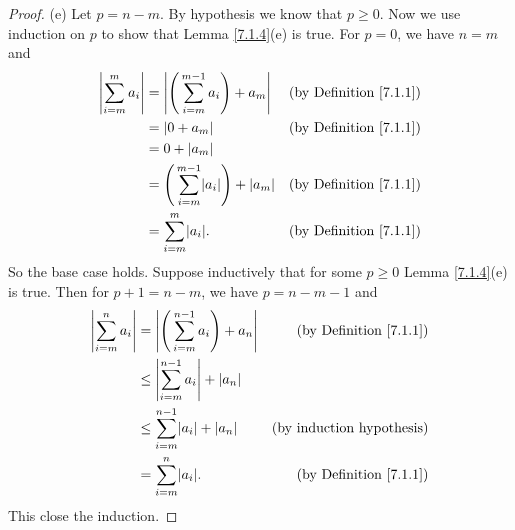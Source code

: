 \begin{proof}{(e)}
    Let \(p = n - m\).
    By hypothesis we know that \(p \geq 0\).
    Now we use induction on \(p\) to show that Lemma \ref{7.1.4}(e) is true.
    For \(p = 0\), we have \(n = m\) and
    \begin{align*}
        \abs*{\sum_{i = m}^m a_i} & = \abs*{\Bigg(\sum_{i = m}^{m - 1} a_i\Bigg) + a_m}        & \text{(by Definition \ref{7.1.1})} \\
                                  & = \abs*{0 + a_m}                                           & \text{(by Definition \ref{7.1.1})} \\
                                  & = 0 + \abs*{a_m}                                                                                \\
                                  & = \Bigg(\sum_{i = m}^{m - 1} \abs*{a_i}\Bigg) + \abs*{a_m} & \text{(by Definition \ref{7.1.1})} \\
                                  & = \sum_{i = m}^m \abs*{a_i}.                               & \text{(by Definition \ref{7.1.1})}
    \end{align*}
    So the base case holds.
    Suppose inductively that for some \(p \geq 0\) Lemma \ref{7.1.4}(e) is true.
    Then for \(p + 1 = n - m\), we have \(p = n - m - 1\) and
    \begin{align*}
        \abs*{\sum_{i = m}^n a_i} & = \abs*{\Bigg(\sum_{i = m}^{n - 1} a_i\Bigg) + a_n} & \text{(by Definition \ref{7.1.1})} \\
                                  & \leq \abs*{\sum_{i = m}^{n - 1} a_i} + \abs*{a_n}                                        \\
                                  & \leq \sum_{i = m}^{n - 1} \abs*{a_i} + \abs*{a_n}   & \text{(by induction hypothesis)}   \\
                                  & = \sum_{i = m}^n \abs*{a_i}.                        & \text{(by Definition \ref{7.1.1})}
    \end{align*}
    This close the induction.
\end{proof}

